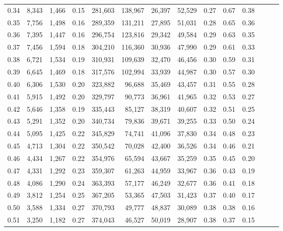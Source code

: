 \begin{tabular}{rrrrrrrrrrrrrr}
0.34 &   8,343 &  1,466 &  0.15 &  281,603 &  138,967 &  26,397 &  52,529 &  0.27 &  0.67 &      0.38 \\
0.35 &   7,756 &  1,498 &  0.16 &  289,359 &  131,211 &  27,895 &  51,031 &  0.28 &  0.65 &      0.36 \\
0.36 &   7,395 &  1,447 &  0.16 &  296,754 &  123,816 &  29,342 &  49,584 &  0.29 &  0.63 &      0.35 \\
0.37 &   7,456 &  1,594 &  0.18 &  304,210 &  116,360 &  30,936 &  47,990 &  0.29 &  0.61 &      0.33 \\
0.38 &   6,721 &  1,534 &  0.19 &  310,931 &  109,639 &  32,470 &  46,456 &  0.30 &  0.59 &      0.31 \\
0.39 &   6,645 &  1,469 &  0.18 &  317,576 &  102,994 &  33,939 &  44,987 &  0.30 &  0.57 &      0.30 \\
0.40 &   6,306 &  1,530 &  0.20 &  323,882 &   96,688 &  35,469 &  43,457 &  0.31 &  0.55 &      0.28 \\
0.41 &   5,915 &  1,492 &  0.20 &  329,797 &   90,773 &  36,961 &  41,965 &  0.32 &  0.53 &      0.27 \\
0.42 &   5,646 &  1,358 &  0.19 &  335,443 &   85,127 &  38,319 &  40,607 &  0.32 &  0.51 &      0.25 \\
0.43 &   5,291 &  1,352 &  0.20 &  340,734 &   79,836 &  39,671 &  39,255 &  0.33 &  0.50 &      0.24 \\
0.44 &   5,095 &  1,425 &  0.22 &  345,829 &   74,741 &  41,096 &  37,830 &  0.34 &  0.48 &      0.23 \\
0.45 &   4,713 &  1,304 &  0.22 &  350,542 &   70,028 &  42,400 &  36,526 &  0.34 &  0.46 &      0.21 \\
0.46 &   4,434 &  1,267 &  0.22 &  354,976 &   65,594 &  43,667 &  35,259 &  0.35 &  0.45 &      0.20 \\
0.47 &   4,331 &  1,292 &  0.23 &  359,307 &   61,263 &  44,959 &  33,967 &  0.36 &  0.43 &      0.19 \\
0.48 &   4,086 &  1,290 &  0.24 &  363,393 &   57,177 &  46,249 &  32,677 &  0.36 &  0.41 &      0.18 \\
0.49 &   3,812 &  1,254 &  0.25 &  367,205 &   53,365 &  47,503 &  31,423 &  0.37 &  0.40 &      0.17 \\
0.50 &   3,588 &  1,334 &  0.27 &  370,793 &   49,777 &  48,837 &  30,089 &  0.38 &  0.38 &      0.16 \\
0.51 &   3,250 &  1,182 &  0.27 &  374,043 &   46,527 &  50,019 &  28,907 &  0.38 &  0.37 &      0.15 \\

\end{tabular}

